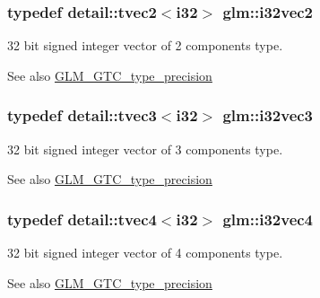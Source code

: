 \subsubsection[{i32vec2}]{\setlength{\rightskip}{0pt plus 5cm}typedef detail\+::tvec2$<$i32$>$ {\bf glm\+::i32vec2}}\label{group__gtc__type__precision_gaa63418303dbcfc01d53f82f659eab5c1}
32 bit signed integer vector of 2 components type. \begin{DoxySeeAlso}{See also}
\hyperlink{group__gtc__type__precision}{G\+L\+M\+\_\+\+G\+T\+C\+\_\+type\+\_\+precision} 
\end{DoxySeeAlso}
\hypertarget{group__gtc__type__precision_ga26740d2ca3314c87950293788455c41a}{}
\subsubsection[{i32vec3}]{\setlength{\rightskip}{0pt plus 5cm}typedef detail\+::tvec3$<$i32$>$ {\bf glm\+::i32vec3}}\label{group__gtc__type__precision_ga26740d2ca3314c87950293788455c41a}
32 bit signed integer vector of 3 components type. \begin{DoxySeeAlso}{See also}
\hyperlink{group__gtc__type__precision}{G\+L\+M\+\_\+\+G\+T\+C\+\_\+type\+\_\+precision} 
\end{DoxySeeAlso}
\hypertarget{group__gtc__type__precision_gaa8d1842279485fdc4688969980e9d731}{}
\subsubsection[{i32vec4}]{\setlength{\rightskip}{0pt plus 5cm}typedef detail\+::tvec4$<$i32$>$ {\bf glm\+::i32vec4}}\label{group__gtc__type__precision_gaa8d1842279485fdc4688969980e9d731}
32 bit signed integer vector of 4 components type. \begin{DoxySeeAlso}{See also}
\hyperlink{group__gtc__type__precision}{G\+L\+M\+\_\+\+G\+T\+C\+\_\+type\+\_\+precision} 
\end{DoxySeeAlso}
\hypertarget{group__gtc__type__precision_gac7a7eaad46064fc952b06df33689da23}{}
